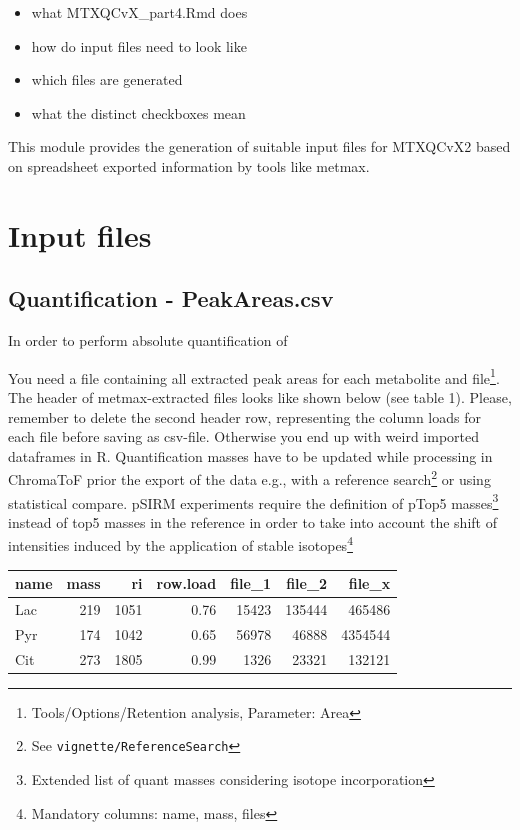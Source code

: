 \documentclass[]{book}
\providecommand{\tightlist}{%
  \setlength{\itemsep}{0pt}\setlength{\parskip}{0pt}}
\let\rmarkdownfootnote\footnote%
\def\footnote{\protect\rmarkdownfootnote}
\theoremstyle{definition}
\theoremstyle{definition}
\theoremstyle{definition}
\theoremstyle{remark}
\begin{document}
\begin{itemize}
\tightlist
\item
  what MTXQCvX\_part4.Rmd does
\item
  how do input files need to look like
\item
  which files are generated
\item
  what the distinct checkboxes mean
\end{itemize}

This module provides the generation of suitable input files for MTXQCvX2
based on spreadsheet exported information by tools like metmax.

\section{Input files}\label{input-files-1}

\subsection{Quantification -
PeakAreas.csv}\label{quantification---peakareas.csv}

In order to perform absolute quantification of

You need a file containing all extracted peak areas for each metabolite
and file\footnote{Tools/Options/Retention analysis, Parameter: Area}.
The header of metmax-extracted files looks like shown below (see table
1). Please, remember to delete the second header row, representing the
column loads for each file before saving as csv-file. Otherwise you end
up with weird imported dataframes in R. Quantification masses have to be
updated while processing in ChromaToF prior the export of the data e.g.,
with a reference search\footnote{See \texttt{vignette/ReferenceSearch}}
or using statistical compare. pSIRM experiments require the definition
of pTop5 masses\footnote{Extended list of quant masses considering
  isotope incorporation} instead of top5 masses in the reference in
order to take into account the shift of intensities induced by the
application of stable isotopes\footnote{Mandatory columns: name, mass,
  files}

\begin{tabular}{l|r|r|r|r|r|r}
\hline
name & mass & ri & row.load & file\_1 & file\_2 & file\_x\\
\hline
Lac & 219 & 1051 & 0.76 & 15423 & 135444 & 465486\\
\hline
Pyr & 174 & 1042 & 0.65 & 56978 & 46888 & 4354544\\
\hline
Cit & 273 & 1805 & 0.99 & 1326 & 23321 & 132121\\
\hline
\end{tabular}
\end{document}
